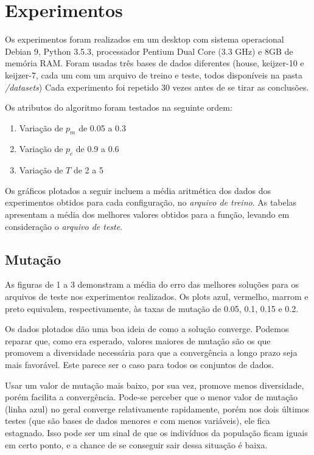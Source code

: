 \documentclass[11pt]{article}
\begin{document}
\section{Experimentos}

Os experimentos foram realizados em um desktop com sistema operacional Debian 9, Python 3.5.3, processador Pentium Dual Core (3.3 GHz) e 8GB de memória RAM. Foram usadas três bases de dados diferentes (house, keijzer-10 e keijzer-7, cada um com um arquivo de treino e teste, todos disponíveis na pasta \textit{/datasets}) Cada experimento foi repetido 30 vezes antes de se tirar as conclusões.

Os atributos do algoritmo foram testados na seguinte ordem:

\begin{enumerate}
	\item Variação de $p_m$ de 0.05 a 0.3
	\item Variação de $p_c$ de 0.9 a 0.6
	\item Variação de $T$ de 2 a 5
\end{enumerate}

Os gráficos plotados a seguir incluem a média aritmética dos dados dos experimentos obtidos para cada configuração, no \textit{arquivo de treino}. As tabelas apresentam a média dos melhores valores obtidos para a função, levando em consideração o \textit{arquivo de teste}.

\subsection{Mutação}

As figuras de 1 a 3 demonstram a média do erro das melhores soluções para os arquivos de teste nos experimentos realizados. Os plots azul, vermelho, marrom e preto equivalem, respectivamente, às taxas de mutação de 0.05, 0.1, 0.15 e 0.2.

Os dados plotados dão uma boa ideia de como a solução converge. Podemos reparar que, como era esperado, valores maiores de mutação são os que promovem a diversidade necessária para que a convergência a longo prazo seja mais favorável. Este parece ser o caso para todos os conjuntos de dados.

Usar um valor de mutação mais baixo, por sua vez, promove menos diversidade, porém facilita a convergência. Pode-se perceber que o menor valor de mutação (linha azul) no geral converge relativamente rapidamente, porém nos dois últimos testes (que são bases de dados menores e com menos variáveis), ele fica estagnado. Isso pode ser um sinal de que os indivíduos da população ficam iguais em certo ponto, e a chance de se conseguir sair dessa situação é baixa.
\end{document}
